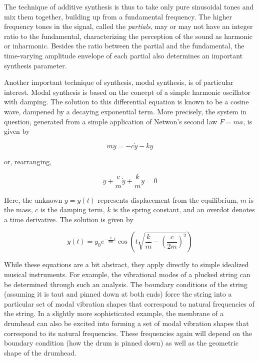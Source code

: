 The technique of additive synthesis is thus to take only pure sinusoidal tones
and mix them together, building up from a fundamental frequency. The higher
frequency tones in the signal, called the {\em partials}, may or may not have
an integer ratio to the fundamental, characterizing the perception of the sound
as harmonic or inharmonic. Besides the ratio between the partial and the fundamental,
the time-varying amplitude envelope of each partial also determines an important
synthesis parameter.

Another important technique of synthesis, modal synthesis, is of particular interest. 
Modal synthesis is based on the concept of a simple harmonic oscillator with damping.
The solution to this differential equation is known to be a cosine wave, dampened by
a decaying exponential term. More precisely, the system in question, generated from
a simple application of Netwon's second law $F = ma$, is given by 

\begin{equation}
m\ddot{y} = -c \dot{y} - ky
\end{equation}

or, rearranging,

\begin{equation}
\label{eq:dampedosc}
\ddot{y} + \frac{c}{m} \dot{y} + \frac{k}{m}y = 0
\end{equation}

Here, the unknown $y = y(t)$ represents displacement from the equilibrium, $m$ is the mass, $c$ is the damping term, $k$ is the spring constant,
and an overdot denotes a time derivative. The solution is given by

\begin{equation}
y(t) = y_0 e^{-\frac{c}{2m}t} \cos\left({t \sqrt{\frac{k}{m} - \left(\frac{c}{2m}\right)^2}}\right)
\end{equation}

While these equations are a bit abstract, they apply directly to simple idealized musical instruments. For example,
the vibrational modes of a plucked string can be determined through such an analysis. The boundary conditions
of the string (assuming it is taut and pinned down at both ends) force the string into a particular set
of modal vibration shapes that correspond to natural frequencies of the string. In a slightly
more sophisticated example, the membrane of a drumhead can also be excited into forming a set of
modal vibration shapes that correspond to its natural frequencies. These frequencies again will depend on the
boundary condition (how the drum is pinned down) as well as the geometric shape of the drumhead. 

